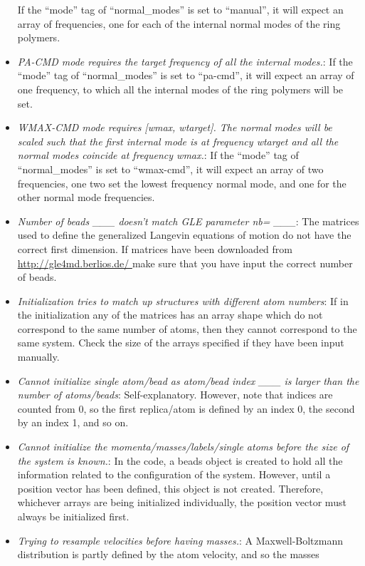 \documentclass[11pt,english,fleqn]{report}
\begin{document}
\begin{itemize}
If the {}``mode'' tag of {}``normal\_modes'' is set to {}``manual'',
it will expect an array of frequencies, one for each of the internal
normal modes of the ring polymers. 
\item \emph{PA-CMD mode requires the target frequency of all the internal modes.}:
If the {}``mode'' tag of {}``normal\_modes'' is set to {}``pa-cmd'',
it will expect an array of one frequency, to which all the internal
modes of the ring polymers will be set. 
\item \emph{WMAX-CMD mode requires [wmax, wtarget]. The normal modes will be scaled such that the first internal mode is at frequency wtarget and all the normal modes coincide at frequency wmax.}:
If the {}``mode'' tag of {}``normal\_modes'' is set to {}``wmax-cmd'',
it will expect an array of two frequencies, one two set the lowest
frequency normal mode, and one for the other normal mode frequencies.
\item \emph{Number of beads \_\_\_ doesn't match GLE parameter nb= \_\_\_}:
The matrices used to define the generalized Langevin equations of
motion do not have the correct first dimension. If matrices have been
downloaded from \url{http://gle4md.berlios.de/ } make sure that you
have input the correct number of beads.
\item \emph{Initialization tries to match up structures with different atom numbers}:
If in the initialization any of the matrices has an array shape which
do not correspond to the same number of atoms, then they cannot correspond
to the same system. Check the size of the arrays specified if they
have been input manually.
\item \emph{Cannot initialize single atom/bead as atom/bead index \_\_\_ is larger than the number of atoms/beads}:
Self-explanatory. However, note that indices are counted from 0, so
the first replica/atom is defined by an index 0, the second by an
index 1, and so on.
\item \emph{Cannot initialize the momenta/masses/labels/single atoms before the size of the system is known.}:
In the code, a beads object is created to hold all the information
related to the configuration of the system. However, until a position
vector has been defined, this object is not created. Therefore, whichever
arrays are being initialized individually, the position vector must
always be initialized first.
\item \emph{Trying to resample velocities before having masses.}: A Maxwell-Boltzmann
distribution is partly defined by the atom velocity, and so the masses

\end{itemize}
\end{document}
